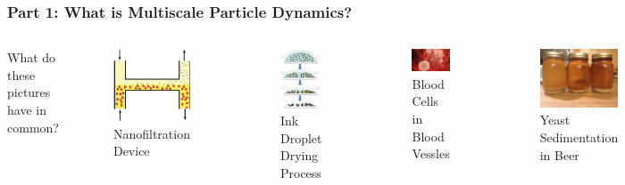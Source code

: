 \documentclass[aspectratio=169,xcolor=dvipsnames]{beamer}
\begin{document}
\begin{frame}
	\frametitle{Part 1: What is Multiscale Particle Dynamics?}
	
	\begin{columns}
		What do these pictures have in common?\\
		
		\begin{columns}	
			\begin{figure}
				\includegraphics[width=4cm]{Microfilter.png}
				\caption{ Nanofiltration Device}
			\end{figure}
			\begin{figure}		
				\includegraphics[width=4cm]{printing1.png}
				\caption{Ink Droplet Drying Process}
			\end{figure}
		\end{columns}
		
		\begin{figure}
			\includegraphics[width=3cm]{bloodcells.jpg}
			\caption{Blood Cells in Blood Vessles}
		\end{figure}
		\begin{figure}
			\includegraphics[width=3cm]{beer.jpg}
			\caption{Yeast Sedimentation in Beer}
		\end{figure}
		
	\end{columns}
\end{frame}
\end{document}
